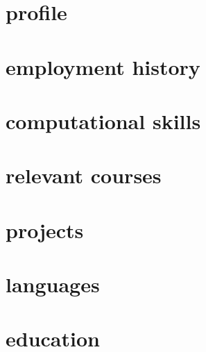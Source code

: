 \documentclass{prometheus_cv}
\begin{document}
\thispagestyle{empty}
\pagestyle{fancy}

\vspace*{-1cm}
\centering


\vspace*{0.4cm}

\section{profile}


\section{employment history}


\section{computational skills}


\section{relevant courses}


\section{projects}


\section{languages}


\section{education}

\end{document}
